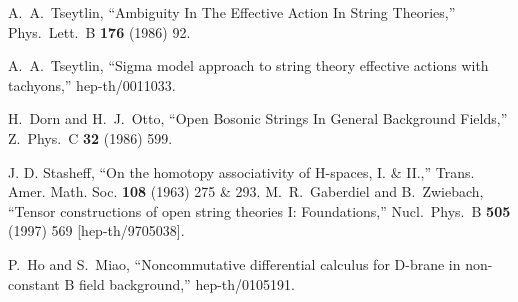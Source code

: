 \documentclass[a4paper,12pt]{article}
\begin{document}
A.~A.~Tseytlin,
``Ambiguity In The Effective Action In String Theories,''
Phys.\ Lett.\ B {\bf 176} (1986) 92.

A.~A.~Tseytlin,
``Sigma model approach to string theory effective actions with tachyons,''
hep-th/0011033.

H.~Dorn and H.~J.~Otto,
``Open Bosonic Strings In General Background Fields,''
Z.\ Phys.\ C {\bf 32} (1986) 599.
 
J. D. Stasheff, ``On the homotopy associativity of H-spaces,
	I. \& II.,'' Trans. Amer. Math. Soc. {\bf 108} (1963) 275 \& 293. 
M.~R.~Gaberdiel and B.~Zwiebach,
``Tensor constructions of open string theories I: Foundations,''
Nucl.\ Phys.\ B {\bf 505} (1997) 569
[hep-th/9705038].

P.~Ho and S.~Miao,
``Noncommutative differential calculus for D-brane in non-constant B  
field background,''
hep-th/0105191.
\end{document}
